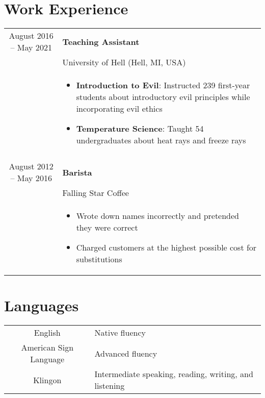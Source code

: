 \documentclass[legalpaper,11pt]{article}
\newenvironment{CVSpan}
{
    \begin{tabular}{S|T}
}
{
     \end{tabular}\vspace{0.5\baselineskip}
}
\newcommand{\CVInfo}[2]{
    #1 & #2\\
}
\newcommand{\CVItems}[1]{
    &
    \begin{itemize}
    #1
    \end{itemize}\\
}
\newcommand{\CVBreak}{
    \multicolumn{2}{c}{}\\
}
\begin{document}


\section{Work Experience}

\begin{CVSpan}
\CVInfo{August 2016 -- May 2021}{\textbf{Teaching Assistant}}
    \CVInfo{}{University of Hell (Hell, MI, USA)}
    \CVItems{\item \textbf{Introduction to Evil}: Instructed 239 first-year students about introductory evil principles while incorporating evil ethics
             \item \textbf{Temperature Science}: Taught 54 undergraduates about heat rays and freeze rays
    }

\CVBreak

    \CVInfo{August 2012 -- May 2016}{\textbf{Barista}}
    \CVInfo{}{Falling Star Coffee}
    \CVItems{
    \item Wrote down names incorrectly and pretended they were correct
    \item Charged customers at the highest possible cost for substitutions
    }
\end{CVSpan}


\section{Languages}

\begin{CVSpan}
    \CVInfo{English}{Native fluency}
    \CVInfo{American Sign Language}{Advanced fluency}
    \CVInfo{Klingon}{Intermediate speaking, reading, writing, and listening}
\end{CVSpan}

\end{document}
